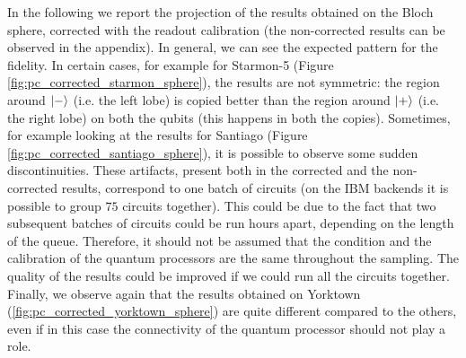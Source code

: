 In the following we report the projection of the results obtained on the Bloch sphere, corrected with the readout calibration (the non-corrected results can be observed in the appendix). 
In general, we can see the expected pattern for the fidelity.
In certain cases, for example for Starmon-5 (Figure \ref{fig:pc_corrected_starmon_sphere}), the results are not symmetric: the region around $\ket{-}$ (i.e. the left lobe) is copied better than the region around $\ket{+}$ (i.e. the right lobe) on both the qubits (this happens in both the copies).
Sometimes, for example looking at the results for Santiago (Figure \ref{fig:pc_corrected_santiago_sphere}), it is possible to observe some sudden discontinuities.
These artifacts, present both in the corrected and the non-corrected results, correspond to one batch of circuits (on the IBM backends it is possible to group $75$ circuits together).
This could be due to the fact that two subsequent batches of circuits could be run hours apart, depending on the length of the queue.
Therefore, it should not be assumed that the condition and the calibration of the quantum processors are the same throughout the sampling.
The quality of the results could be improved if we could run all the circuits together.
Finally, we observe again that the results obtained on Yorktown (\ref{fig:pc_corrected_yorktown_sphere}) are quite different compared to the others, even if in this case the connectivity of the quantum processor should not play a role.

